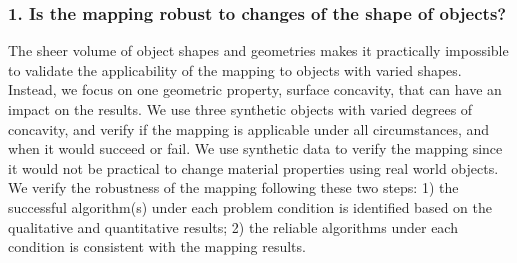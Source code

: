 




\subsubsection{1. Is the mapping robust to changes of the shape of objects?}
The sheer volume of object shapes and geometries makes it practically impossible to validate the applicability of the mapping to objects with varied shapes. Instead, we focus on one geometric property, surface concavity, that can have an impact on the results. We use three synthetic objects with varied degrees of concavity, and verify if the mapping is applicable under all circumstances, and when it would succeed or fail. We use synthetic data to verify the mapping since it would not be practical to change material properties using real world objects. We verify the robustness of the mapping following these two steps: 1) the successful algorithm(s) under each problem condition is identified based on the qualitative and quantitative results; 2) the reliable algorithms under each condition is consistent with the mapping results.

